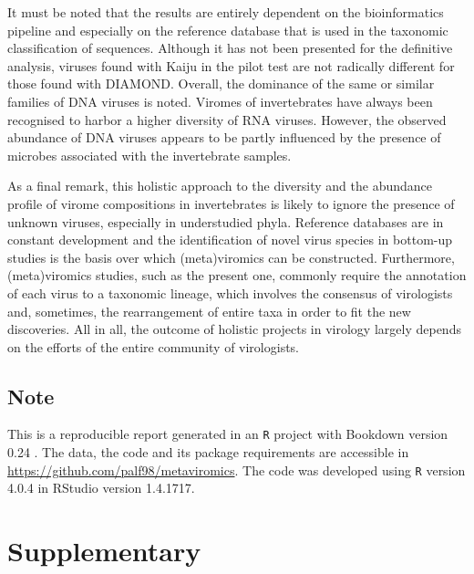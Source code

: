 \documentclass[
  openany]{book}
\begin{document}
It must be noted that the results are entirely dependent on the bioinformatics pipeline and especially on the reference database that is used in the taxonomic classification of sequences. Although it has not been presented for the definitive analysis, viruses found with Kaiju in the pilot test are not radically different for those found with DIAMOND. Overall, the dominance of the same or similar families of DNA viruses is noted. Viromes of invertebrates have always been recognised to harbor a higher diversity of RNA viruses. However, the observed abundance of DNA viruses appears to be partly influenced by the presence of microbes associated with the invertebrate samples.

As a final remark, this holistic approach to the diversity and the abundance profile of virome compositions in invertebrates is likely to ignore the presence of unknown viruses, especially in understudied phyla. Reference databases are in constant development and the identification of novel virus species in bottom-up studies is the basis over which (meta)viromics can be constructed. Furthermore, (meta)viromics studies, such as the present one, commonly require the annotation of each virus to a taxonomic lineage, which involves the consensus of virologists and, sometimes, the rearrangement of entire taxa in order to fit the new discoveries. All in all, the outcome of holistic projects in virology largely depends on the efforts of the entire community of virologists.

\hypertarget{note}{%
\section*{Note}\label{note}}

This is a reproducible report generated in an \texttt{R} project with Bookdown version 0.24 \autocite{Xie2016,Xie2022}. The data, the code and its package requirements are accessible in \url{https://github.com/palf98/metaviromics}. The code was developed using \texttt{R} version 4.0.4 in RStudio version 1.4.1717.

\hypertarget{supplementary}{%
\chapter{Supplementary}\label{supplementary}}
\end{document}
